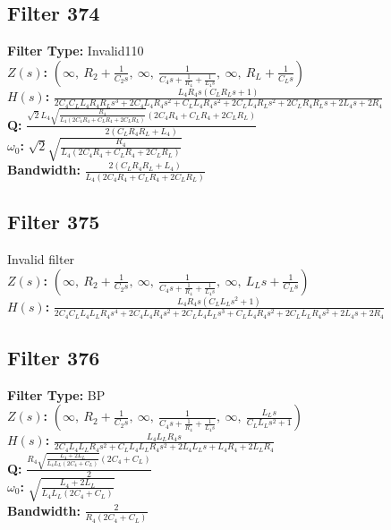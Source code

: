 \documentclass{article}
\begin{document}
\subsection*{Filter 374}
\textbf{Filter Type:} Invalid110 \\ 
\textbf{$Z(s)$:} $\left( \infty, \  R_{2} + \frac{1}{C_{2} s}, \  \infty, \  \frac{1}{C_{4} s + \frac{1}{R_{4}} + \frac{1}{L_{4} s}}, \  \infty, \  R_{L} + \frac{1}{C_{L} s}\right)$ \\ 
\textbf{$H(s)$:} $\frac{L_{4} R_{4} s \left(C_{L} R_{L} s + 1\right)}{2 C_{4} C_{L} L_{4} R_{4} R_{L} s^{3} + 2 C_{4} L_{4} R_{4} s^{2} + C_{L} L_{4} R_{4} s^{2} + 2 C_{L} L_{4} R_{L} s^{2} + 2 C_{L} R_{4} R_{L} s + 2 L_{4} s + 2 R_{4}}$ \\ 
\textbf{Q:} $\frac{\sqrt{2} L_{4} \sqrt{\frac{R_{4}}{L_{4} \left(2 C_{4} R_{4} + C_{L} R_{4} + 2 C_{L} R_{L}\right)}} \left(2 C_{4} R_{4} + C_{L} R_{4} + 2 C_{L} R_{L}\right)}{2 \left(C_{L} R_{4} R_{L} + L_{4}\right)}$ \\ 
\textbf{$\omega_0$:} $\sqrt{2} \sqrt{\frac{R_{4}}{L_{4} \left(2 C_{4} R_{4} + C_{L} R_{4} + 2 C_{L} R_{L}\right)}}$ \\ 
\textbf{Bandwidth:} $\frac{2 \left(C_{L} R_{4} R_{L} + L_{4}\right)}{L_{4} \left(2 C_{4} R_{4} + C_{L} R_{4} + 2 C_{L} R_{L}\right)}$ \\ 
\subsection*{Filter 375}
Invalid filter \\ 
\textbf{$Z(s)$:} $\left( \infty, \  R_{2} + \frac{1}{C_{2} s}, \  \infty, \  \frac{1}{C_{4} s + \frac{1}{R_{4}} + \frac{1}{L_{4} s}}, \  \infty, \  L_{L} s + \frac{1}{C_{L} s}\right)$ \\ 
\textbf{$H(s)$:} $\frac{L_{4} R_{4} s \left(C_{L} L_{L} s^{2} + 1\right)}{2 C_{4} C_{L} L_{4} L_{L} R_{4} s^{4} + 2 C_{4} L_{4} R_{4} s^{2} + 2 C_{L} L_{4} L_{L} s^{3} + C_{L} L_{4} R_{4} s^{2} + 2 C_{L} L_{L} R_{4} s^{2} + 2 L_{4} s + 2 R_{4}}$ \\ 
\subsection*{Filter 376}
\textbf{Filter Type:} BP \\ 
\textbf{$Z(s)$:} $\left( \infty, \  R_{2} + \frac{1}{C_{2} s}, \  \infty, \  \frac{1}{C_{4} s + \frac{1}{R_{4}} + \frac{1}{L_{4} s}}, \  \infty, \  \frac{L_{L} s}{C_{L} L_{L} s^{2} + 1}\right)$ \\ 
\textbf{$H(s)$:} $\frac{L_{4} L_{L} R_{4} s}{2 C_{4} L_{4} L_{L} R_{4} s^{2} + C_{L} L_{4} L_{L} R_{4} s^{2} + 2 L_{4} L_{L} s + L_{4} R_{4} + 2 L_{L} R_{4}}$ \\ 
\textbf{Q:} $\frac{R_{4} \sqrt{\frac{L_{4} + 2 L_{L}}{L_{4} L_{L} \left(2 C_{4} + C_{L}\right)}} \left(2 C_{4} + C_{L}\right)}{2}$ \\ 
\textbf{$\omega_0$:} $\sqrt{\frac{L_{4} + 2 L_{L}}{L_{4} L_{L} \left(2 C_{4} + C_{L}\right)}}$ \\ 
\textbf{Bandwidth:} $\frac{2}{R_{4} \left(2 C_{4} + C_{L}\right)}$ \\ 
\end{document}
